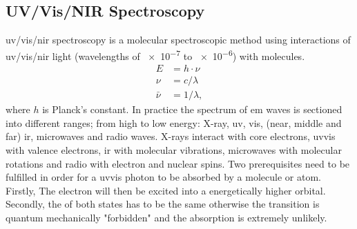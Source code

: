 \subsection{UV/Vis/NIR Spectroscopy}
\Gls{uv}/\gls{vis}/\gls{nir} spectroscopy is a molecular spectroscopic method using 
interactions of \gls{uv}/\gls{vis}/\gls{nir} light 
(wavelengths of \num{e-7} to \num{e-6}\m{}) with molecules\cite{Schwedt2008}.
\begin{align*}
	E &= h \cdot \nu \\
	\nu &= c/ \lambda \\
	\bar{\nu} &= 1/\lambda,
\end{align*}
where $h$ is Planck's constant.
In practice the spectrum of \gls{em} waves is sectioned into different ranges; %
from high to low energy: X-ray, \gls{uv}, \gls{vis}, (near, middle and far) \gls{ir}, microwaves and radio waves. 
X-rays interact with core electrons, \gls{uv}\gls{vis} with valence electrons, \gls{ir} with  molecular vibrations, microwaves with molecular rotations and radio with electron and nuclear spins. 
%
Two prerequisites need to be fulfilled in order for a \gls{uv}\gls{vis} photon to be 
absorbed by a molecule or atom.
Firstly, 
The electron will then be excited into a energetically higher orbital.
Secondly, the  of both states has to be the same otherwise the transition is quantum mechanically "forbidden" and the absorption is extremely unlikely. 

